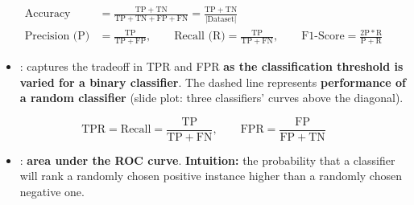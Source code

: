 \begin{align}
  \text{Accuracy} &= \frac{\mathrm{TP}+\mathrm{TN}}{\mathrm{TP}+\mathrm{TN}
    +\mathrm{FP}+\mathrm{FN}} = \frac{\mathrm{TP}+\mathrm{TN}}{|\text{Dataset}|}
    \label{eq:lec05-binacc}\\
  \text{Precision (P)} &= \frac{\mathrm{TP}}{\mathrm{TP}+\mathrm{FP}},\qquad
  \text{Recall (R)} = \frac{\mathrm{TP}}{\mathrm{TP}+\mathrm{FN}},\qquad
  \text{F1-Score} = \frac{2\mathrm{P}*\mathrm{R}}{\mathrm{P}+\mathrm{R}}
    \label{eq:lec05-prf}
\end{align}
\begin{itemize}
  \item {}: captures the tradeoff in TPR and FPR \textbf{as the
    classification threshold is varied for a binary classifier}. The dashed
    line represents \textbf{performance of a random classifier} (slide plot:
    three classifiers' curves above the diagonal).
\end{itemize}
\begin{equation}\label{eq:lec05-tpr}
  \mathrm{TPR} = \mathrm{Recall} = \frac{\mathrm{TP}}{\mathrm{TP}+\mathrm{FN}},
  \qquad
  \mathrm{FPR} = \frac{\mathrm{FP}}{\mathrm{FP}+\mathrm{TN}}
\end{equation}
\begin{itemize}
  \item {}: \textbf{area under the ROC curve}. \textbf{Intuition:}
    the probability that a classifier will rank a randomly chosen positive
    instance higher than a randomly chosen negative one.
\end{itemize}

